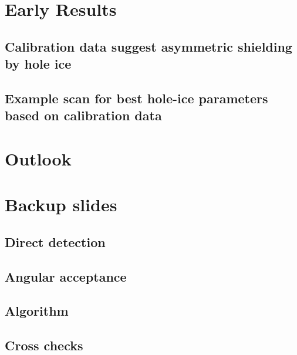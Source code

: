 \documentclass[green, 12pt]{beamer}
\begin{document}
\section{Early Results}
\subsection{Calibration data suggest asymmetric shielding by hole ice}
  
\subsection{Example scan for best hole-ice parameters based on calibration data}
  

\section{Outlook}
  
  

\appendix
\section{Backup slides}
  

\subsection{Direct detection}
  

\subsection{Angular acceptance}
  
  

\subsection{Algorithm}
  

\subsection{Cross checks}
  
  
  
  
\end{document}
